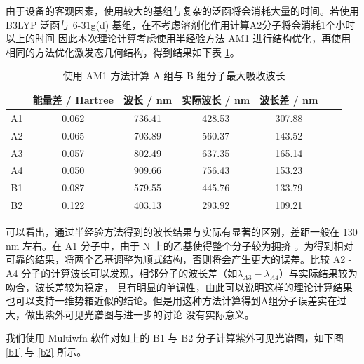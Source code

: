 \documentclass[cn,hazy,pku,12pt,normal,math=newtx,cite=super]{elegantnote}
\begin{document}
由于设备的客观因素，使用较大的基组与复杂的泛函将会消耗大量的时间。若使用 B3LYP 泛函与 6-31g(d) 基组，在不考虑溶剂化作用计算A2分子将会消耗1个小时以上的时间
因此本次理论计算考虑使用半经验方法 AM1 进行结构优化，再使用相同的方法优化激发态几何结构，得到结果如下表 \ref{22}。


\begin{table}[h]
    \centering
    \caption{使用 AM1 方法计算 A 组与 B 组分子最大吸收波长}
    \label{22}
    \begin{tabular}{ccccccc}
    \hline
       &  能量差 / Hartree & 波长 / nm & 实际波长 / nm & 波长差 / nm \\ \hline
    A1 &  0.062         & 736.41  & 428.53    & 307.88   \\
    A2 &  0.065         & 703.89  & 560.37    & 143.52   \\
    A3 &  0.057         & 802.49  & 637.35    & 165.14   \\
    A4 &  0.050         & 909.66  & 756.43    & 153.23   \\
    B1 &  0.087         & 579.55  & 445.76    & 133.79    \\
    B2 &  0.122         & 403.13  & 293.92    & 109.21    \\ \hline
    \end{tabular}
\end{table}

可以看出，通过半经验方法得到的波长结果与实际有显著的区别，差距一般在 130 nm 左右。在 A1 分子中，由于 N 上的乙基使得整个分子较为拥挤
。为得到相对可靠的结果，将两个乙基调整为顺式结构，否则将会产生更大的误差。比较 A2 - A4 分子的计算波长可以发现，相邻分子的波长差（如$\lambda_{A3}-\lambda_{A4}$）与实际结果较为吻合，波长差较为稳定，
具有明显的单调性，由此可以说明这样的理论计算结果也可以支持一维势箱近似的结论。但是用这种方法计算得到A组分子误差实在过大，做出紫外可见光谱图与进一步的讨论
没有实际意义。

我们使用 Multiwfn 软件对如上的 B1 与 B2 分子计算紫外可见光谱图，如下图 \ref{b1} 与 \ref{b2} 所示。\cite{DBLP:journals/jcc/LuC12}
\end{document}
